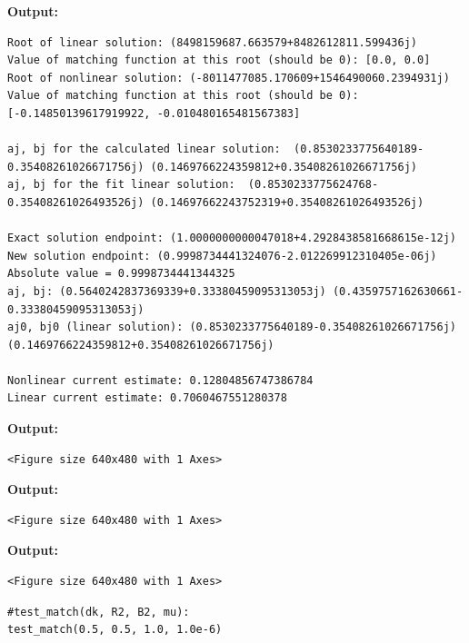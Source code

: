 \documentclass{article}
\begin{document}
\textbf{Output:}\begin{verbatim}
Root of linear solution: (8498159687.663579+8482612811.599436j)
Value of matching function at this root (should be 0): [0.0, 0.0]
Root of nonlinear solution: (-8011477085.170609+1546490060.2394931j)
Value of matching function at this root (should be 0): [-0.14850139617919922, -0.010480165481567383]

aj, bj for the calculated linear solution:  (0.8530233775640189-0.35408261026671756j) (0.1469766224359812+0.35408261026671756j)
aj, bj for the fit linear solution:  (0.8530233775624768-0.35408261026493526j) (0.14697662243752319+0.35408261026493526j)

Exact solution endpoint: (1.0000000000047018+4.2928438581668615e-12j)
New solution endpoint: (0.9998734441324076-2.012269912310405e-06j) Absolute value = 0.9998734441344325
aj, bj: (0.5640242837369339+0.33380459095313053j) (0.4359757162630661-0.33380459095313053j)
aj0, bj0 (linear solution): (0.8530233775640189-0.35408261026671756j) (0.1469766224359812+0.35408261026671756j)

Nonlinear current estimate: 0.12804856747386784
Linear current estimate: 0.7060467551280378

\end{verbatim}

\textbf{Output:}\begin{verbatim}
<Figure size 640x480 with 1 Axes>
\end{verbatim}

\textbf{Output:}\begin{verbatim}
<Figure size 640x480 with 1 Axes>
\end{verbatim}

\textbf{Output:}\begin{verbatim}
<Figure size 640x480 with 1 Axes>
\end{verbatim}

\begin{lstlisting}
#test_match(dk, R2, B2, mu):
test_match(0.5, 0.5, 1.0, 1.0e-6)\end{lstlisting}
\end{document}
